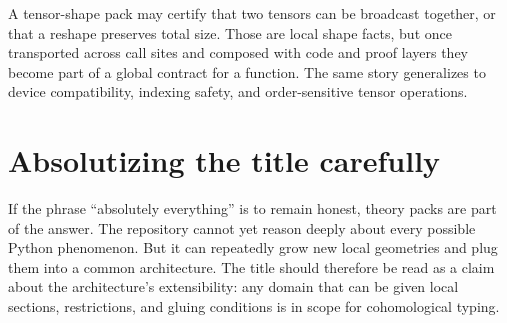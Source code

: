 \begin{example}
A tensor-shape pack may certify that two tensors can be broadcast together, or that a
reshape preserves total size. Those are local shape facts, but once transported across
call sites and composed with code and proof layers they become part of a global contract
for a function. The same story generalizes to device compatibility, indexing safety, and
order-sensitive tensor operations.
\end{example}

\section*{Absolutizing the title carefully}
If the phrase ``absolutely everything'' is to remain honest, theory packs are part of the
answer. The repository cannot yet reason deeply about every possible Python phenomenon.
But it can repeatedly grow new local geometries and plug them into a common architecture.
The title should therefore be read as a claim about the architecture's extensibility: any
domain that can be given local sections, restrictions, and gluing conditions is in scope
for cohomological typing.
